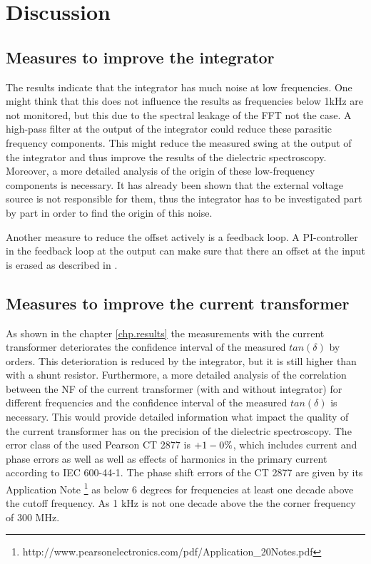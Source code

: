 \chapter{Discussion}

\section{Measures to improve the integrator}
The results indicate that the integrator has much noise at low frequencies. One might think that this does not influence the results as frequencies below 1kHz are not monitored, but this due to the spectral leakage of the FFT not the case.  A high-pass filter at the output of the integrator could reduce these parasitic frequency components. This might reduce the measured swing at the output of the integrator and thus improve the results of the dielectric spectroscopy. 
Moreover, a more detailed analysis of the origin of these low-frequency components is necessary. It has already been shown that the external voltage source is not responsible for them, thus the integrator has to be investigated part by part in order to find the origin of this noise. 

Another measure to reduce the offset actively is a feedback loop. A PI-controller in the feedback loop at the output can make sure that there an offset at the input is erased as described in \cite{thomas}. 

\section{Measures to improve the current transformer}
As shown in the chapter \ref{chp.results} the measurements with the current transformer deteriorates the confidence interval of the measured $tan(\delta)$ by orders. This deterioration is reduced by the integrator, but it is still higher than with a shunt resistor. 
Furthermore, a more detailed analysis of the correlation between the NF of the current transformer (with and without integrator) for different frequencies and the confidence interval of the measured $tan(\delta)$ is necessary. This would provide detailed information what impact the quality of the current transformer has on the precision of the dielectric spectroscopy. 
The error class of the used Pearson CT 2877 is $+1\/-0\%$, which includes current and phase errors as well as well as effects of harmonics in the primary current according to IEC 600-44-1. The phase shift errors of the CT 2877 are given by its Application Note \footnote{ http://www.pearsonelectronics.com/pdf/Application_20Notes.pdf} as below 6 degrees for frequencies at least one decade above the cutoff frequency. As 1 kHz is not one decade above the the corner frequency of 300 MHz. 
